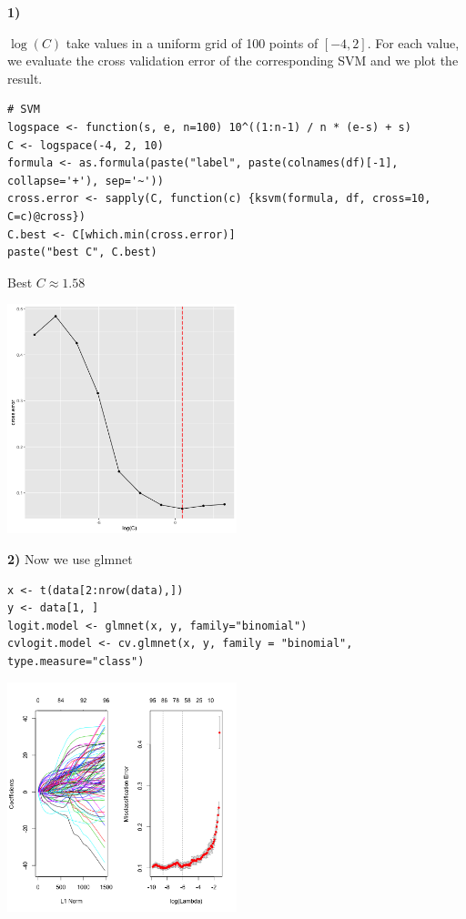 \documentclass[11pt]{article}
\begin{document}
\textbf{1)}

\(\log(C)\) take values in a uniform grid of 100 points of \([-4, 2]\). For each value, we evaluate the cross validation error of the corresponding SVM and we plot the result.
\begin{verbatim}
# SVM                                        
logspace <- function(s, e, n=100) 10^((1:n-1) / n * (e-s) + s)
C <- logspace(-4, 2, 10)
formula <- as.formula(paste("label", paste(colnames(df)[-1], collapse='+'), sep='~'))
cross.error <- sapply(C, function(c) {ksvm(formula, df, cross=10, C=c)@cross})
C.best <- C[which.min(cross.error)]
paste("best C", C.best)
\end{verbatim}

Best \(C \approx 1.58\)

\begin{org}
\begin{center}
\includegraphics[width=0.5\textwidth]{svmcrosserror.png}
\end{center}
\end{org}



\textbf{2)} Now we use glmnet

\begin{verbatim}
x <- t(data[2:nrow(data),])
y <- data[1, ]
logit.model <- glmnet(x, y, family="binomial")
cvlogit.model <- cv.glmnet(x, y, family = "binomial", type.measure="class")
\end{verbatim}



\begin{org}
\begin{center}
\includegraphics[width=0.5\textwidth]{logitcrosserror.png}
\end{center}
\end{org}
\end{document}

